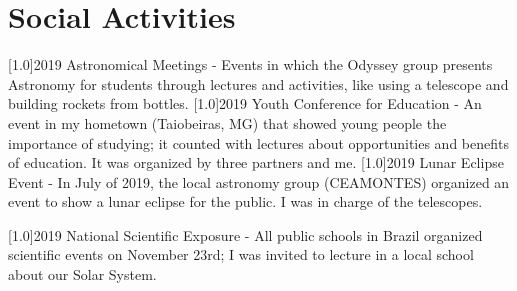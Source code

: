 \documentclass{cv-style}
\begin{document}
\section{Social Activities}
    \vspace{-0.2cm}
    \begin{entrylist}
        \entry
            {\scalebox{.8}[1.0]{2019}}
            {Astronomical Meetings - {}}
            {}
            {Events in which the Odyssey group presents Astronomy for students through lectures and activities, like using a telescope and building rockets from bottles.}
        \entry
            {\scalebox{.8}[1.0]{2019}}
            {Youth Conference for Education - {}}
            {}
            {An event in my hometown (Taiobeiras, MG) that showed young people the importance of studying; it counted with lectures about opportunities and benefits of education. It was organized by three partners and me.}
        \entry
            {\scalebox{.8}[1.0]{2019}}
            {Lunar Eclipse Event - {}}
            {}
            {In July of 2019, the local astronomy group (CEAMONTES) organized an event to show a lunar eclipse for the public. I was in charge of the telescopes.}
    \end{entrylist}
\newpage
    \begin{entrylist}
        \entry
            {\scalebox{.8}[1.0]{2019}}
            {National Scientific Exposure - {}}
            {}
            {All public schools in Brazil organized scientific events on November 23rd; I was invited to lecture in a local school about our Solar System.}
    \end{entrylist}
\end{document}
